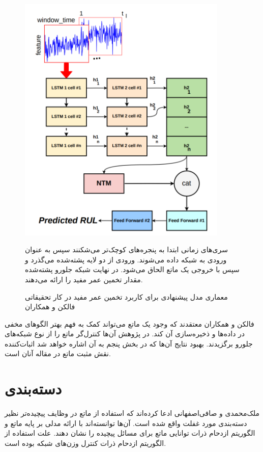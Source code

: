 \begin{figure}[!h]
\begin{center}
\includegraphics[height=12cm]{RUL.png}
\end{center}
\caption{معماری مدل پیشنهادی برای کاربرد تخمین عمر مفید در کار تحقیقاتی فالکن و همکاران\cite{falcon2020neural}}
\medskip
\small
سری‌های زمانی ابتدا به پنجره‌های کوچک‌تر می‌شکنند سپس به عنوان ورودی به شبکه داده می‌شوند. ورودی از دو لایه  پشته‌شده می‌گذرد و سپس با خروجی یک ماتع الحاق می‌شود. در نهایت شبکه جلورو پشته‌شده مقدار تخمین عمر مفید را ارائه می‌دهند.\cite{falcon2020neural} 
\end{figure}

فالکن و همکاران معتقدند که وجود یک ماتع می‌تواند کمک به فهم بهتر الگوهای مخفی در داده‌ها و ذخیره‌سازی آن کند. در پژوهش آن‌ها کنترل‌گر ماتع را از نوع شبکه‌های جلورو برگزیدند.\cite{falcon2020neural} بهبود نتایج آن‌ها که در بخش پنجم به آن اشاره خواهد شد اثبات‌کننده نقش مثبت ماتع در مقاله آنان است.

\section{دسته‌بندی}
ملک‌محمدی و صافی‌اصفهانی ادعا کرده‌اند که استفاده از ماتع در وظایف پیچیده‌تر نظیر دسته‌بندی مورد غفلت واقع شده است. آن‌ها توانسته‌اند با ارائه مدلی بر پایه ماتع و الگوریتم ازدحام ذرات توانایی ماتع برای مسائل پیچیده را نشان دهند. علت استفاده از الگوریتم ازدحام ذرات کنترل وزن‌های شبکه بوده است.\cite{faradonbe2020classifier}
\\

